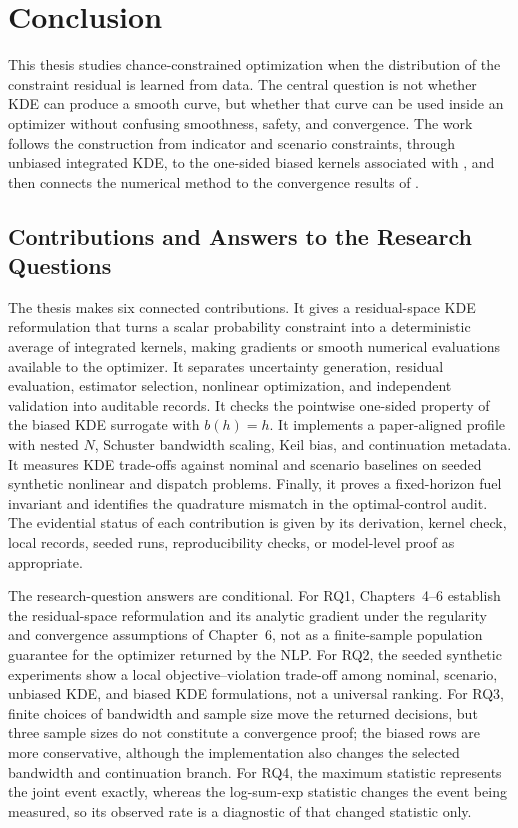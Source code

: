 \section{Conclusion}
\label{ch:conclusion}

This thesis studies chance-constrained optimization when the distribution of the constraint residual is learned from data. The central question is not whether KDE can produce a smooth curve, but whether that curve can be used inside an optimizer without confusing smoothness, safety, and convergence. The work follows the construction from indicator and scenario constraints, through unbiased integrated KDE, to the one-sided biased kernels associated with \citet{keil2020,keil2021}, and then connects the numerical method to the convergence results of \citet{schuster2025}.

\subsection{Contributions and Answers to the Research Questions}

The thesis makes six connected contributions. It gives a residual-space KDE
reformulation that turns a scalar probability constraint into a deterministic
average of integrated kernels, making gradients or smooth numerical evaluations
available to the optimizer. It separates uncertainty generation, residual
evaluation, estimator selection, nonlinear optimization, and independent
validation into auditable records. It checks the pointwise one-sided property
of the biased KDE surrogate with $b(h)=h$. It implements a paper-aligned
profile with nested $N$, Schuster bandwidth scaling, Keil bias, and continuation
metadata. It measures KDE trade-offs against nominal and scenario baselines on
seeded synthetic nonlinear and dispatch problems. Finally, it proves a
fixed-horizon fuel invariant and identifies the quadrature mismatch in the
optimal-control audit. The evidential status of each contribution is given by
its derivation, kernel check, local records, seeded runs, reproducibility checks,
or model-level proof as appropriate.

The research-question answers are conditional. For RQ1, Chapters~4--6 establish
the residual-space reformulation and its analytic gradient under the regularity
and convergence assumptions of Chapter~6, not as a finite-sample population
guarantee for the optimizer returned by the NLP. For RQ2, the seeded synthetic
experiments show a local objective--violation trade-off among nominal,
scenario, unbiased KDE, and biased KDE formulations, not a universal
ranking. For RQ3, finite choices of bandwidth and sample size move the
returned decisions, but three sample sizes do not constitute a convergence
proof; the biased rows are more conservative, although the implementation also
changes the selected bandwidth and continuation branch. For RQ4, the maximum
statistic represents the joint event exactly, whereas the log-sum-exp statistic
changes the event being measured, so its observed rate is a diagnostic of that
changed statistic only.

